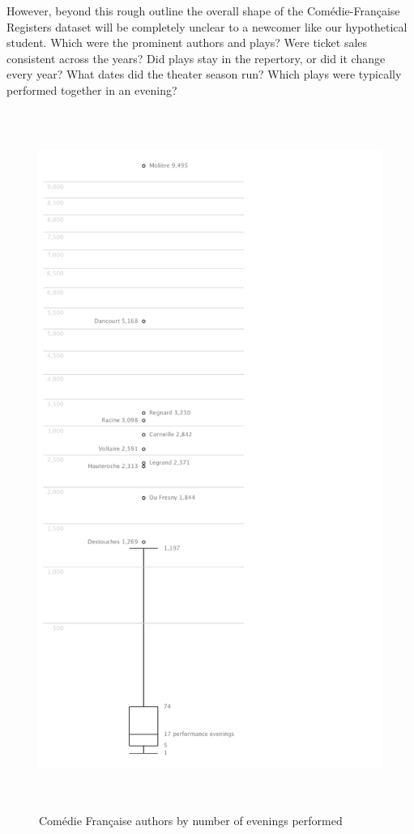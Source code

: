 \documentclass[	DIV=calc,%
							paper=a4,%
							fontsize=11pt,%
							twocolumn]{scrartcl}	 					%
\begin{document}
However, beyond this rough outline the overall shape of the Comédie-Française Registers dataset will be completely unclear to a newcomer like our hypothetical student.  Which were the prominent authors and plays? Were ticket sales consistent across the years?  Did plays stay in the repertory, or did it change every year?  What dates did the theater season run?  Which plays were typically performed together in an evening?

\begin{figure}
  \centering
  \includegraphics[height=9in]{viz/author_performances.pdf}
	\caption{Comédie Française authors by number of evenings performed}
  \label{fig:tukey_boxplot}
\end{figure}
\end{document}
